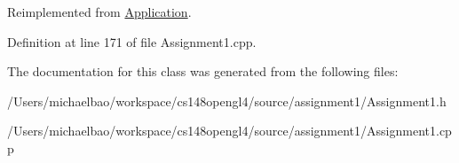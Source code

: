 Reimplemented from \hyperlink{class_application_ae6074c3f102de1cb2fe4c81b545679db}{Application}.



Definition at line 171 of file Assignment1.\+cpp.



The documentation for this class was generated from the following files\+:\begin{DoxyCompactItemize}
\item 
/\+Users/michaelbao/workspace/cs148opengl4/source/assignment1/Assignment1.\+h\item 
/\+Users/michaelbao/workspace/cs148opengl4/source/assignment1/Assignment1.\+cpp\end{DoxyCompactItemize}
